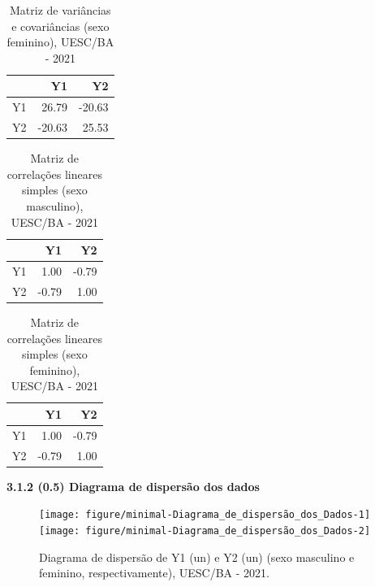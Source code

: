 \documentclass[12pt]{article}\usepackage[]{graphicx}\usepackage[]{color}
\newenvironment{knitrout}{}{} %
\begin{document}
\begin{table}[!ht]
   \centering
   \caption{Matriz de variâncias e covariâncias (sexo feminino), UESC/BA - 2021}
   \begin{tabular}{rrr}
   \hline
  & Y1 & Y2\\ 
  \hline
  Y1 & 26.79 & -20.63 \\ 
  Y2 & -20.63 & 25.53 \\ 
   \hline
\end{tabular}
\end{table}

\begin{table}[!ht]
   \centering
   \caption{Matriz de correlações lineares simples (sexo masculino), UESC/BA - 2021}
   \begin{tabular}{rrr}
   \hline
  & Y1 & Y2\\ 
  \hline
  Y1 & 1.00 & -0.79 \\ 
  Y2 & -0.79 & 1.00 \\
  \hline
  \end{tabular}
\end{table}

\begin{table}[!ht]
  \centering
  \caption{Matriz de correlações lineares simples (sexo feminino), UESC/BA - 2021}
  \begin{tabular}{rrr}
   \hline
  & Y1 & Y2\\ 
  \hline
  Y1 & 1.00 & -0.79 \\ 
  Y2 & -0.79 & 1.00 \\ 
  \hline
  \end{tabular}
\end{table}
 \clearpage
  \textbf{3.1.2 (0.5) Diagrama de dispersão dos dados}
\begin{figure}[!h]
\label{figura:Diagrama de dispersão}
\begin{knitrout}
\color{fgcolor}

{\centering \texttt{[image: figure/minimal-Diagrama\_de\_dispersão\_dos\_Dados-1]} 
\texttt{[image: figure/minimal-Diagrama\_de\_dispersão\_dos\_Dados-2]} 

}


\end{knitrout}
\caption{Diagrama de dispersão de Y1 (un) e Y2 (un) (sexo masculino e feminino, respectivamente), UESC/BA - 2021.}
\end{figure}
\end{document}
